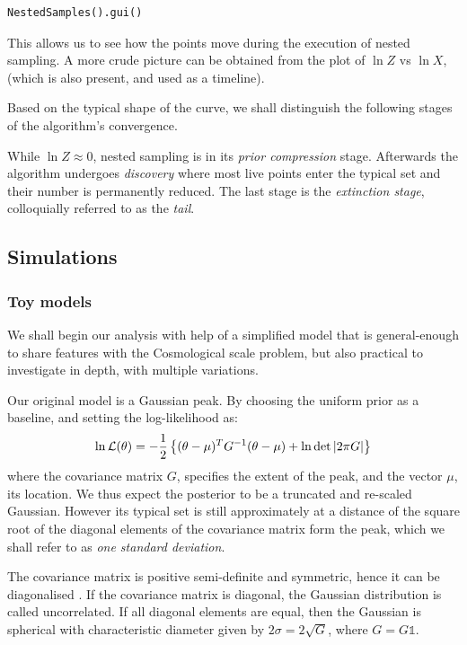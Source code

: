 \documentclass[usenatbib]{mnras}
\begin{document}
\begin{verbatim}
NestedSamples().gui()
\end{verbatim}
This allows us to see how the points move during the execution of
nested sampling. A more crude picture can be obtained from the plot
of \(\ln Z\) vs \(\ln X\), (which is also present, and used as a
timeline).

Based on the typical shape of the curve, we shall distinguish the
following stages of the algorithm's convergence. 

While \(\ln Z \approx 0\), nested sampling is in its \emph{prior
compression} stage.  Afterwards the algorithm undergoes \emph{discovery}
where most live points enter the typical set and their number is
permanently reduced. The last stage is the \emph{extinction stage},
colloquially referred to as the \emph{tail}.


\subsection{Simulations}
\label{sec:orge989f6e}
\subsubsection{Toy models}
\label{sec:orgb257330}

We shall begin our analysis with help of a simplified model that is
general-enough to share features with the Cosmological scale
problem, but also practical to investigate in depth, with multiple
variations.

Our original model is a Gaussian peak. By choosing the uniform prior as a baseline, and setting the log-likelihood as:
\begin{equation}
  \ln {\cal L}(\theta) = - \frac{1}{2} \left\{(\theta - \mu)^{T}G^{-1}(\theta-\mu)  + \ln \det \left| 2\pi G\right| \right\}
\end{equation}
where the covariance matrix \(G\), specifies the extent of the peak,
and the vector \(\mu\), its location. We thus expect the posterior to
be a truncated and re-scaled Gaussian. However its typical set is
still approximately at a distance of the square root of the diagonal elements of the
covariance matrix form the peak, which we shall refer to as \emph{one
standard deviation}.

The covariance matrix is positive semi-definite and symmetric,
hence it can be diagonalised \citep{taboga2017lectures}. If the covariance matrix is diagonal,
the Gaussian distribution is called uncorrelated. If all diagonal
elements are equal, then the Gaussian is spherical with
characteristic diameter given by \(2 \sigma = 2\sqrt{G}\), where \(G = G
	\mathbb{1}\).
\end{document}
